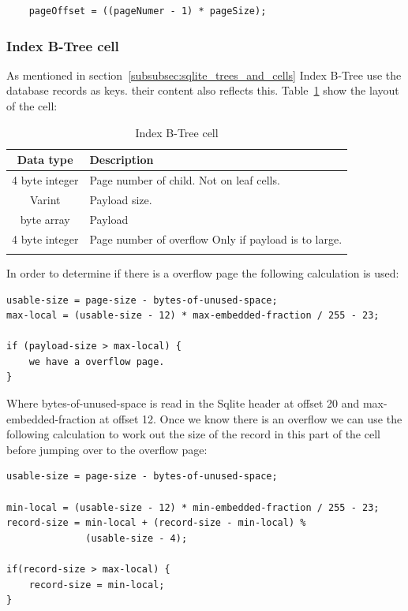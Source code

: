 \begin{lstlisting}	
	pageOffset = ((pageNumer - 1) * pageSize);
\end{lstlisting}

\subsubsection{Index B-Tree cell}
\label{subsubsec:index_btree_cell}

As mentioned in section~\ref{subsubsec:sqlite_trees_and_cells} Index B-Tree use the database records as keys. their content also reflects this. Table~\ref{tbl:index_btree_cell} show the layout of the cell:

\begin{longtable}[h]{| c | p{5cm} |}
		\hline
			\textbf{Data type} & \textbf{Description} \\ 
		\hline
		\endhead
			4 byte integer & Page number of child. \newline 
							 Not on leaf cells.\\
		\hline
			Varint & Payload size. \\
		\hline
			byte array & Payload \\
		\hline
			4 byte integer & Page number of overflow \newline
							  Only if payload is to large.\\
		\hline
	\caption{Index B-Tree cell}
	\label{tbl:index_btree_cell}
\end{longtable}

In order to determine if there is a overflow page the following calculation is used:

\begin{lstlisting}	
usable-size = page-size - bytes-of-unused-space;
max-local = (usable-size - 12) * max-embedded-fraction / 255 - 23;

if (payload-size > max-local) {
	we have a overflow page.
}
\end{lstlisting}

Where bytes-of-unused-space is read in the Sqlite header at offset 20 and \newline max-embedded-fraction at offset 12. Once we know there is an overflow we can use the following calculation to work out the size of the record in this part of the cell before jumping over to the overflow page:  

\begin{lstlisting}	
usable-size = page-size - bytes-of-unused-space;

min-local = (usable-size - 12) * min-embedded-fraction / 255 - 23;
record-size = min-local + (record-size - min-local) % 
			  (usable-size - 4);

if(record-size > max-local) {
	record-size = min-local;
}
\end{lstlisting}

